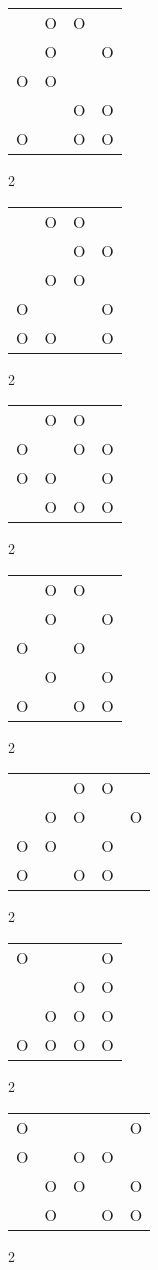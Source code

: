 \begin{tabular}{|m{0.2cm}m{0.2cm}m{0.2cm}m{0.2cm}|}\hline
 &O&O& \\
 &O& &O\\
O&O& & \\
 & &O&O\\
O& &O&O\\
\hline\end{tabular}2
\begin{tabular}{|m{0.2cm}m{0.2cm}m{0.2cm}m{0.2cm}|}\hline
 &O&O& \\
 & &O&O\\
 &O&O& \\
O& & &O\\
O&O& &O\\
\hline\end{tabular}2
\begin{tabular}{|m{0.2cm}m{0.2cm}m{0.2cm}m{0.2cm}|}\hline
 &O&O& \\
O& &O&O\\
O&O& &O\\
 &O&O&O\\
\hline\end{tabular}2
\begin{tabular}{|m{0.2cm}m{0.2cm}m{0.2cm}m{0.2cm}|}\hline
 &O&O& \\
 &O& &O\\
O& &O& \\
 &O& &O\\
O& &O&O\\
\hline\end{tabular}2
\begin{tabular}{|m{0.2cm}m{0.2cm}m{0.2cm}m{0.2cm}m{0.2cm}|}\hline
 & &O&O& \\
 &O&O& &O\\
O&O& &O& \\
O& &O&O& \\
\hline\end{tabular}2
\begin{tabular}{|m{0.2cm}m{0.2cm}m{0.2cm}m{0.2cm}|}\hline
O& & &O\\
 & &O&O\\
 &O&O&O\\
O&O&O&O\\
\hline\end{tabular}2
\begin{tabular}{|m{0.2cm}m{0.2cm}m{0.2cm}m{0.2cm}m{0.2cm}|}\hline
O& & & &O\\
O& &O&O& \\
 &O&O& &O\\
 &O& &O&O\\
\hline\end{tabular}2
